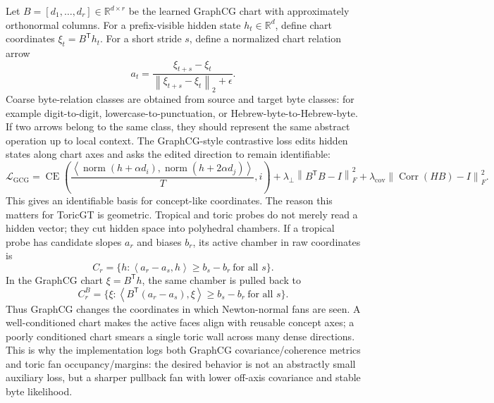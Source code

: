 \documentclass[11pt]{article}
\theoremstyle{definition}
\theoremstyle{plain}
\theoremstyle{remark}
\numberwithin{equation}{section}
\newcommand{\R}{\mathbb{R}}
\newcommand{\norm}[1]{\left\lVert #1\right\rVert}
\newcommand{\ip}[2]{\left\langle #1,#2\right\rangle}
\newcommand{\transpose}{^{\mathsf T}}
\begin{document}
Let $B=[d_1,\ldots,d_r]\in\R^{d\times r}$ be the learned GraphCG chart with approximately orthonormal columns.  For a prefix-visible hidden state $h_t\in\R^d$, define chart coordinates $\xi_t=B\transpose h_t$.  For a short stride $s$, define a normalized chart relation arrow
\begin{equation}
  a_t=\frac{\xi_{t+s}-\xi_t}{\norm{\xi_{t+s}-\xi_t}_2+\epsilon}.
\end{equation}
Coarse byte-relation classes are obtained from source and target byte classes: for example digit-to-digit, lowercase-to-punctuation, or Hebrew-byte-to-Hebrew-byte.  If two arrows belong to the same class, they should represent the same abstract operation up to local context.  The GraphCG-style contrastive loss edits hidden states along chart axes and asks the edited direction to remain identifiable:
\begin{equation}
  \mathcal L_{\mathrm{GCG}}
  =
  \operatorname{CE}\left(
  \frac{\ip{\operatorname{norm}(h+\alpha d_i)}
           {\operatorname{norm}(h+2\alpha d_j)}}{T},
  i\right)
  +\lambda_{\perp}\norm{B\transpose B-I}_F^2
  +\lambda_{\mathrm{cov}}\norm{\operatorname{Corr}(H B)-I}_F^2.
\end{equation}
This gives an identifiable basis for concept-like coordinates.  The reason this matters for ToricGT is geometric.  Tropical and toric probes do not merely read a hidden vector; they cut hidden space into polyhedral chambers.  If a tropical probe has candidate slopes $a_r$ and biases $b_r$, its active chamber in raw coordinates is
\begin{equation}
  C_r=\{h:\ip{a_r-a_s}{h}\ge b_s-b_r\ \text{for all }s\}.
\end{equation}
In the GraphCG chart $\xi=B\transpose h$, the same chamber is pulled back to
\begin{equation}
  C_r^B=\{\xi:\ip{B\transpose(a_r-a_s)}{\xi}\ge b_s-b_r\ \text{for all }s\}.
\end{equation}
Thus GraphCG changes the coordinates in which Newton-normal fans are seen.  A well-conditioned chart makes the active faces align with reusable concept axes; a poorly conditioned chart smears a single toric wall across many dense directions.  This is why the implementation logs both GraphCG covariance/coherence metrics and toric fan occupancy/margins: the desired behavior is not an abstractly small auxiliary loss, but a sharper pullback fan with lower off-axis covariance and stable byte likelihood.
\end{document}
